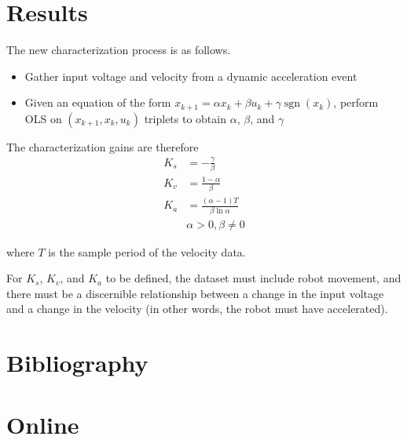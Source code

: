 \documentclass[10pt,conference,compsoc]{IEEEtran}
\DeclareMathOperator{\sgn}{sgn}
\begin{document}
\section{Results}

The new characterization process is as follows.
\begin{itemize}
  \item Gather input voltage and velocity from a dynamic acceleration event
  \item Given an equation of the form
    $x_{k+1} = \alpha x_k + \beta u_k + \gamma\sgn(x_k)$, perform OLS on
    $(x_{k+1}, x_k, u_k)$ triplets to obtain $\alpha$, $\beta$, and $\gamma$
\end{itemize}

The characterization gains are therefore
\begin{align}
  K_s &= -\frac{\gamma}{\beta} \\
  K_v &= \frac{1 - \alpha}{\beta} \\
  K_a &= \frac{(\alpha - 1) T}{\beta \ln\alpha} \\
      &\alpha > 0, \beta \neq 0 \nonumber
\end{align}

where $T$ is the sample period of the velocity data.

For $K_s$, $K_v$, and $K_a$ to be defined, the dataset must include robot
movement, and there must be a discernible relationship between a change in the
input voltage and a change in the velocity (in other words, the robot must have
accelerated).

\section{Bibliography}

\section*{Online}
\printbibliography[heading=bibempty,type=online]
\end{document}
